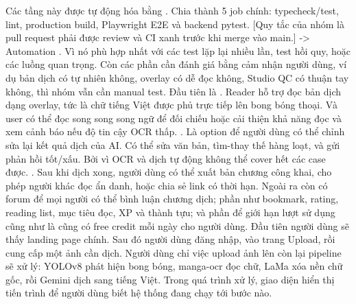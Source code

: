 {}Các tầng này được tự động hóa bằng . Chia thành  5 job chính: typecheck/test, lint, production build, Playwright E2E và backend pytest.\markdownRendererParagraphSeparator
{}[Quy tắc của nhóm là pull request phải được review và CI xanh trước khi merge vào main.]\markdownRendererParagraphSeparator
{}-> Automation . Vì nó phù hợp nhất với các test lặp lại nhiều lần, test hồi quy, hoặc các luồng quan trọng. Còn các phần cần đánh giá bằng cảm nhận người dùng, ví dụ bản dịch có tự nhiên không, overlay có dễ đọc không, Studio QC có thuận tay không, thì nhóm vẫn cần manual test.\markdownRendererInterblockSeparator
{}
\markdownRendererSectionEnd \markdownRendererSectionBegin
{}\markdownRendererInterblockSeparator
{}Đầu tiên là . Reader hỗ trợ đọc bản dịch dạng overlay, tức là chữ tiếng Việt được phủ trực tiếp lên bong bóng thoại. Và user có thể đọc song song song ngữ để đối chiếu hoặc cải thiện khả năng đọc và xem cảnh báo nếu độ tin cậy OCR thấp.\markdownRendererParagraphSeparator
{}. Là option để người dùng có thể chỉnh sửa lại kết quả dịch của AI. Có thể sửa văn bản, tìm-thay thế hàng loạt, và gửi phản hồi tốt/xấu. Bởi vì OCR và dịch tự động không thể cover hết các case được.\markdownRendererParagraphSeparator
{}. Sau khi dịch xong, người dùng có thể xuất bản chương công khai, cho phép người khác đọc ẩn danh, hoặc chia sẻ link có thời hạn.\markdownRendererParagraphSeparator
{}Ngoài ra còn có forum để mọi người có thể bình luận chương dịch; phần  như bookmark, rating, reading list, mục tiêu đọc, XP và thành tựu; và phần  để giới hạn lượt sử dụng cũng như là cũng có free credit mỗi ngày cho người dùng.\markdownRendererInterblockSeparator
{}
\markdownRendererSectionEnd \markdownRendererSectionBegin
{}\markdownRendererInterblockSeparator
{}Đầu tiên người dùng sẽ thấy landing page chính. Sau đó người dùng đăng nhập, vào trang Upload, rồi cung cấp một ảnh cần dịch.\markdownRendererParagraphSeparator
{}Người dùng chỉ việc upload ảnh lên còn lại pipeline sẽ xử lý: YOLOv8 phát hiện bong bóng, manga-ocr đọc chữ, LaMa xóa nền chữ gốc, rồi Gemini dịch sang tiếng Việt. Trong quá trình xử lý, giao diện hiển thị tiến trình để người dùng biết hệ thống đang chạy tới bước nào.\markdownRendererParagraphSeparator
